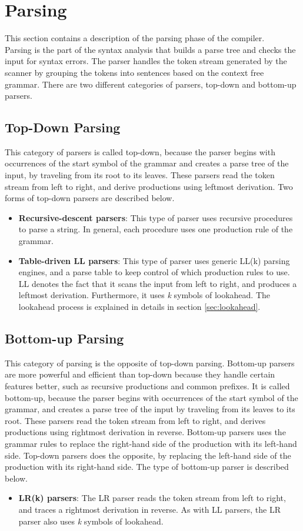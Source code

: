 \section{Parsing}
This section contains a description of the parsing phase of the compiler. 
\\Parsing is the part of the syntax analysis that builds a parse tree and checks the input for syntax errors. The parser handles the token stream generated by the scanner by grouping the tokens into sentences based on the context free grammar. There are two different categories of parsers, top-down and bottom-up parsers.

\subsection{Top-Down Parsing}
This category of parsers is called top-down, because the parser begins with occurrences of the start symbol of the grammar and creates a parse tree of the input, by traveling from its root to its leaves. These parsers read the token stream from left to right, and derive productions using leftmost derivation. Two forms of top-down parsers are described below. 

\begin{itemize}
\item \textbf{Recursive-descent parsers}: This type of parser uses recursive procedures to parse a string.  In general, each procedure uses one production rule of the grammar.
\item \textbf{Table-driven LL parsers}: This type of parser uses generic LL(k) parsing engines, and a parse table to keep control of which production rules to use. LL denotes the fact that it scans the input from left to right, and produces a leftmost derivation. Furthermore, it uses \textit{k} symbols of lookahead. The lookahead process is explained in details in section \ref{sec:lookahead}.
\end{itemize}

\subsection{Bottom-up Parsing}
This category of parsing is the opposite of top-down parsing. Bottom-up parsers are more powerful and efficient than top-down because they handle certain features better, such as recursive productions and common prefixes. It is called bottom-up, because the parser begins with occurrences of the start symbol of the grammar, and creates a parse tree of the input by traveling from its leaves to its root. These parsers read the token stream from left to right, and derives productions using rightmost derivation in reverse. Bottom-up parsers uses the grammar rules to replace the right-hand side of the production with its left-hand side. Top-down parsers does the opposite, by replacing the left-hand side of the production with its right-hand side. The type of bottom-up parser is described below. 

\begin{itemize}
\item \textbf{LR(k) parsers}: The LR parser reads the token stream from left to right, and traces a rightmost derivation in reverse. As with LL parsers, the LR parser also uses \textit{k} symbols of lookahead.  
\end{itemize}
